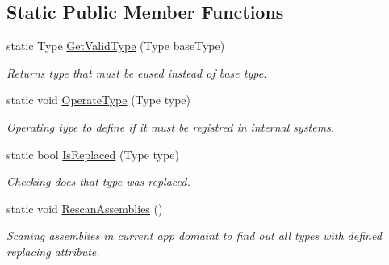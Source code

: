 \subsection*{Static Public Member Functions}
\begin{DoxyCompactItemize}
\item 
static Type \mbox{\hyperlink{class_uniform_data_operator_1_1_assemblies_management_1_1_modifiers_1_1_type_replacer_ab16c97c7cb86db03b862a0fdd5889819}{Get\+Valid\+Type}} (Type base\+Type)
\begin{DoxyCompactList}\small\item\em Returns type that must be eused instead of base type. \end{DoxyCompactList}\item 
static void \mbox{\hyperlink{class_uniform_data_operator_1_1_assemblies_management_1_1_modifiers_1_1_type_replacer_a51670e843f80ee62f24afa784d5424dc}{Operate\+Type}} (Type type)
\begin{DoxyCompactList}\small\item\em Operating type to define if it must be registred in internal systems. \end{DoxyCompactList}\item 
static bool \mbox{\hyperlink{class_uniform_data_operator_1_1_assemblies_management_1_1_modifiers_1_1_type_replacer_a748273934b293a1473b5c6c061990de8}{Is\+Replaced}} (Type type)
\begin{DoxyCompactList}\small\item\em Checking does that type was replaced. \end{DoxyCompactList}\item 
static void \mbox{\hyperlink{class_uniform_data_operator_1_1_assemblies_management_1_1_modifiers_1_1_type_replacer_a3fc9dceab9bd6da387ce1be9213aaa9e}{Rescan\+Assemblies}} ()
\begin{DoxyCompactList}\small\item\em Scaning assemblies in current app domaint to find out all types with defined replacing attribute. \end{DoxyCompactList}\end{DoxyCompactItemize}
